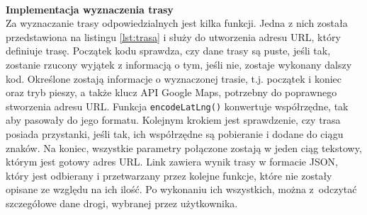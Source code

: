 \noindent
\begin{minipage}{\linewidth}
    \label{lst:schron}
    \centering
\end{minipage}\\

\noindent
\textbf{Implementacja wyznaczenia trasy}\\
\indent Za wyznaczanie trasy odpowiedzialnych jest kilka funkcji. Jedna z nich została przedstawiona na listingu \ref{lst:trasa} i służy do utworzenia adresu URL, który definiuje trasę. Początek kodu sprawdza, czy dane trasy są puste, jeśli tak, zostanie rzucony wyjątek z informacją o tym, jeśli nie, zostaje wykonany dalszy kod. Określone zostają informacje o wyznaczonej trasie, t.j. początek i koniec oraz tryb pieszy, a także klucz API Google Maps, potrzebny do poprawnego stworzenia adresu URL. Funkcja \verb|encodeLatLng()| konwertuje współrzędne, tak aby pasowały do jego formatu. Kolejnym krokiem jest sprawdzenie, czy trasa posiada przystanki, jeśli tak, ich współrzędne są pobieranie i dodane do ciągu znaków. Na koniec, wszystkie parametry połączone zostają w jeden ciąg tekstowy, którym jest gotowy adres URL. Link zawiera wynik trasy w formacie JSON, który jest odbierany i przetwarzany przez kolejne funkcje, które nie zostały opisane ze względu na ich ilość. Po wykonaniu ich wszystkich, można z~odczytać szczegółowe dane drogi, wybranej przez użytkownika. \\

